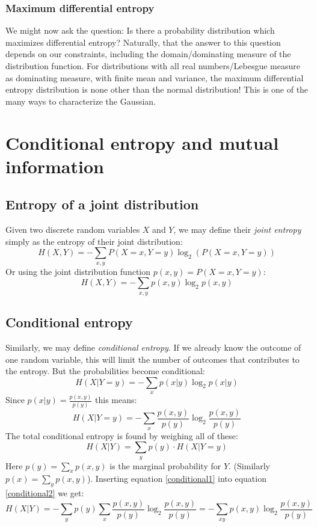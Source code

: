 \documentclass[12pt, a4paper]{article}
\numberwithin{equation}{section}
\begin{document}
\subsubsection{Maximum differential entropy}
We might now ask the question: Is there a probability distribution which maximizes differential entropy? Naturally, that the answer to this question depends on our constraints, including the domain/dominating measure of the distribution function. For distributions with all real numbers/Lebesgue measure as dominating measure, with finite mean and variance, the maximum differential entropy distribution is none other than the normal distribution! This is one of the many ways to characterize the Gaussian.

\section{Conditional entropy and mutual information}

\subsection{Entropy of a joint distribution}
Given two discrete random variables $X$ and $Y$, we may define their \textit{joint entropy} simply as the entropy of their joint distribution:
\begin{equation}
H(X,Y)=-\sum_{x,y}P(X=x, Y=y)\log_2\left(P(X=x, Y=y)\right)
\end{equation}
Or using the joint distribution function $p(x,y)=P(X=x, Y=y)$:
\begin{equation}
H(X,Y)=-\sum_{x,y}p(x,y)\log_2 p(x,y)
\end{equation}

\subsection{Conditional entropy}
Similarly, we may define \textit{conditional entropy}. If we already know the outcome of one random variable, this will limit the number of outcomes that contributes to the entropy. But the probabilities become conditional:
\begin{equation}
H(X|Y=y)=-\sum_x p(x|y)\log_2 p(x|y)
\end{equation}
Since $p(x|y)=\frac{p(x,y)}{p(y)}$ this means:
\begin{equation}
\label{conditional1}
H(X|Y=y)=-\sum_x\frac{p(x,y)}{p(y)}\log_2\frac{p(x,y)}{p(y)}
\end{equation}
The total conditional entropy is found by weighing all of these:
\begin{equation}
\label{conditional2}
H(X|Y)=\sum_y p(y)\cdot H(X|Y=y)
\end{equation}
Here $p(y)=\sum_x p(x,y)$ is the marginal probability for $Y$. (Similarly $p(x)=\sum_y p(x,y)$). Inserting equation \ref{conditional1} into equation \ref{conditional2} we get:
\begin{equation}
H(X|Y)=-\sum_y p(y)\sum_x \frac{p(x,y)}{p(y)}\log_2\frac{p(x,y)}{p(y)}=-\sum_{xy}p(x,y)\log_2\frac{p(x,y)}{p(y)}
\end{equation}
\end{document}
